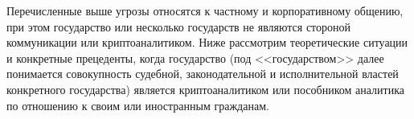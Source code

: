 	Перечисленные выше угрозы относятся к частному и корпоративному общению, при этом государство или несколько государств не являются  стороной коммуникации или криптоаналитиком. Ниже рассмотрим теоретические ситуации и конкретные прецеденты, когда государство (под <<государством>> далее понимается совокупность судебной, законодательной и исполнительной властей конкретного государства) является криптоаналитиком или пособником аналитика по отношению к своим или иностранным гражданам. 
\newpage